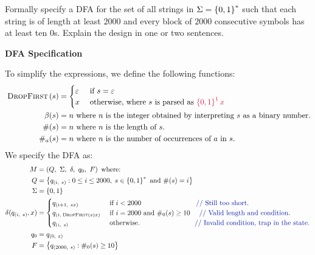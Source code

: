 \begin{problem}
  Formally specify a DFA for the set of all strings in $\Sigma = \left\{0, 1\right\}^*$
  such that each string is of length at least $2000$ and every block of $2000$
  consecutive symbols has at least ten $0$s.
  Explain the design in one or two sentences.
\end{problem}

\begin{Answer}
  \step
  \textbf{DFA Specification}

  \step
  To simplify the expressions, we define the following functions:
  \begin{align*}
    \shift{s} &= \begin{cases}
      \eps &\text{ if } s = \eps\\
      x &\text{ otherwise, where } s \text{ is parsed as } \crim{\set{0, 1}^1x} \\
    \end{cases} \\
    \beta(s) &= n \text{ where $n$ is the integer obtained by interpreting $s$ as a binary number.} \\
    \#(s) &= n \text{ where $n$ is the length of $s$.} \\
    \#_a(s) &= n \text{ where $n$ is the number of occurrences of $a$ in $s$.}
  \end{align*}
  \step
  We specify the DFA as:
  \begin{align*}
    M &= \left( Q,\ \Sigma,\ \delta,\ q_0,\ F \right) \text{ where: }\\
    Q &= \set{ q_{(i,\ s)} : 0 \leq i \le 2000,\; s \in \set{0, 1}^* \text{ and } \#(s) = i} \\
    \Sigma &= \set{0, 1} \\
    \delta(q_{(i,\ s)}, x) &= \begin{cases}
      q_{(i+1,\ sx)} &\text{ if } i < 2000 \quad \quad \quad \quad \quad \quad \quad \quad \zaff{\text{// Still too short.}}\\
      q_{(i, \shift{s}x)} &\text{ if $i = 2000$ and } \#_0(s) \ge 10 \quad \zaff{\text{ // Valid length and condition.}} \\
      q_{(i,\ s)} &\text{ otherwise.} \quad \quad \quad \quad \quad \quad \quad \quad \zaff{\text{// Invalid condition, trap in the state.}}
    \end{cases} \\
    q_0 &= q_{(0,\ \eps)} \\
    F &= \set{ q_{(2000,\ s)} : \#_0(s) \ge 10}
  \end{align*}


\end{Answer}
